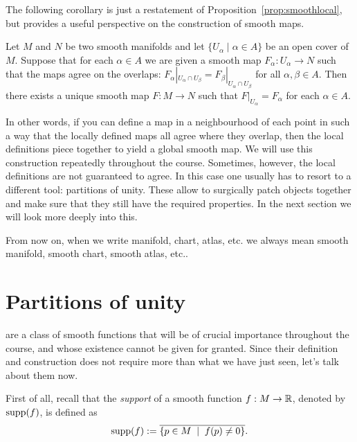 The following corollary is just a restatement of Proposition~\ref{prop:smoothlocal}, but provides a useful perspective on the construction of smooth maps.

\begin{proposition}
  Let $M$ and $N$ be two smooth manifolds and let $\{U_\alpha\mid\alpha\in A\}$ be an open cover of $M$.
  Suppose that for each $\alpha\in A$ we are given a smooth map $F_
  \alpha:U_\alpha\to N$ such that the maps agree on the overlaps: $F_\alpha|_{U_\alpha\cap U_\beta} = F_\beta|_{U_\alpha\cap U_\beta}$ for all $\alpha,\beta\in A$. 
  Then there exists a unique smooth map $F:M\to N$ such that $F|_{U_\alpha} = F_\alpha$ for each $\alpha\in A$.
\end{proposition}

In other words, if you can define a map in a neighbourhood of each point in such a way that the locally defined maps all agree where they overlap, then the local definitions piece together to yield a global smooth map.
We will use this construction repeatedly throughout the course.
Sometimes, however, the local definitions are not guaranteed to agree. In this case one usually has to resort to a different tool: partitions of unity.
These allow to surgically patch objects together and make sure that they still have the required properties.
In the next section we will look more deeply into this.

\begin{tcolorbox}
From now on, when we write manifold, chart, atlas, etc. we always mean smooth manifold, smooth chart, smooth atlas, etc..
\end{tcolorbox}

\section{Partitions of unity}

 are a class of smooth functions that will be of crucial importance throughout the course, and whose existence cannot be given for granted.
Since their definition and construction does not require more than what we have just seen, let's talk about them now.

First of all, recall that the \emph{support} of a smooth function $f: M \to \mathbb{R}$, denoted by $\operatorname{supp}(f)$, is defined as
\begin{equation}
  \operatorname{supp}(f) := \overline{\{ p\in M \;\mid\; f(p) \neq 0\}}.
\end{equation}

